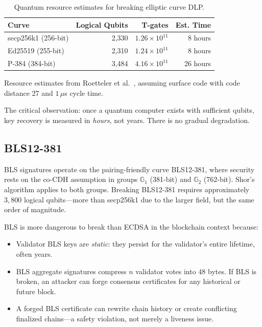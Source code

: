 \documentclass[11pt,a4paper]{article}
\begin{document}
\begin{table}[ht]
\centering
\caption{Quantum resource estimates for breaking elliptic curve DLP.}
\label{tab:ecdsa-resources}
\begin{tabular}{lrrr}
\toprule
\textbf{Curve} & \textbf{Logical Qubits} & \textbf{T-gates} & \textbf{Est. Time} \\
\midrule
secp256k1 (256-bit) & 2{,}330 & $1.26 \times 10^{11}$ & 8 hours \\
Ed25519 (255-bit) & 2{,}310 & $1.24 \times 10^{11}$ & 8 hours \\
P-384 (384-bit) & 3{,}484 & $4.16 \times 10^{11}$ & 26 hours \\
\bottomrule
\end{tabular}
\vspace{0.3em}
\footnotesize{Resource estimates from Roetteler et al.~\cite{roetteler2017quantum},
assuming surface code with code distance 27 and $1\,\mu$s cycle time.}
\end{table}

The critical observation: once a quantum computer exists with sufficient qubits, key
recovery is measured in \emph{hours}, not years. There is no gradual degradation.

\subsection{BLS12-381}

BLS signatures operate on the pairing-friendly curve BLS12-381, where security rests
on the co-CDH assumption in groups $\mathbb{G}_1$ (381-bit) and $\mathbb{G}_2$
(762-bit). Shor's algorithm applies to both groups. Breaking BLS12-381 requires
approximately $3{,}800$ logical qubits---more than secp256k1 due to the larger
field, but the same order of magnitude.

BLS is more dangerous to break than ECDSA in the blockchain context because:
\begin{itemize}[leftmargin=2em]
  \item Validator BLS keys are \emph{static}: they persist for the validator's
        entire lifetime, often years.
  \item BLS aggregate signatures compress $n$ validator votes into 48 bytes. If BLS
        is broken, an attacker can forge consensus certificates for any historical or
        future block.
  \item A forged BLS certificate can rewrite chain history or create conflicting
        finalized chains---a safety violation, not merely a liveness issue.
\end{itemize}
\end{document}
